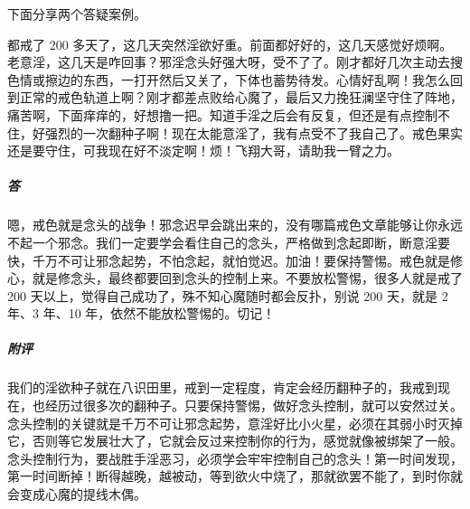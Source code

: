 下面分享两个答疑案例。

\begin{case}
    都戒了 200 多天了，这几天突然淫欲好重。前面都好好的，这几天感觉好烦啊。老意淫，这几天是咋回事？邪淫念头好强大呀，受不了了。刚才都好几次主动去搜色情或擦边的东西，一打开然后又关了，下体也蓄势待发。心情好乱啊！我怎么回到正常的戒色轨道上啊？刚才都差点败给心魔了，最后又力挽狂澜坚守住了阵地，痛苦啊，下面痒痒的，好想撸一把。知道手淫之后会有反复，但还是有点控制不住，好强烈的一次翻种子啊！现在太能意淫了，我有点受不了我自己了。戒色果实还是要守住，可我现在好不淡定啊！烦！飞翔大哥，请助我一臂之力。
    \subparagraph{答} 嗯，戒色就是念头的战争！邪念迟早会跳出来的，没有哪篇戒色文章能够让你永远不起一个邪念。我们一定要学会看住自己的念头，严格做到念起即断，断意淫要快，千万不可让邪念起势，不怕念起，就怕觉迟。加油！要保持警惕。戒色就是修心，就是修念头，最终都要回到念头的控制上来。不要放松警惕，很多人就是戒了 200 天以上，觉得自己成功了，殊不知心魔随时都会反扑，别说 200 天，就是 2 年、3 年、10 年，依然不能放松警惕的。切记！
    \subparagraph{附评} 我们的淫欲种子就在八识田里，戒到一定程度，肯定会经历翻种子的，我戒到现在，也经历过很多次的翻种子。只要保持警惕，做好念头控制，就可以安然过关。念头控制的关键就是千万不可让邪念起势，意淫好比小火星，必须在其弱小时灭掉它，否则等它发展壮大了，它就会反过来控制你的行为，感觉就像被绑架了一般。念头控制行为，要战胜手淫恶习，必须学会牢牢控制自己的念头！第一时间发现，第一时间断掉！断得越晚，越被动，等到欲火中烧了，那就欲罢不能了，到时你就会变成心魔的提线木偶。
\end{case}


